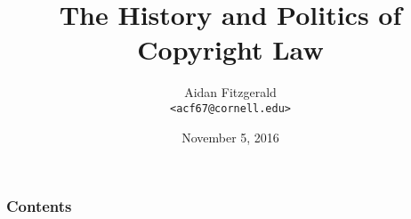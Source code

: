 \documentclass{beamer}
\title{The History and Politics of Copyright Law}
\author{
Aidan Fitzgerald \\
\texttt{<acf67@cornell.edu>}
}
\date{November 5, 2016}
\begin{document}

\begin{frame}
  \titlepage
\end{frame}



\begin{frame}
  \frametitle{Contents}
  \tableofcontents
\end{frame}




\end{document}
